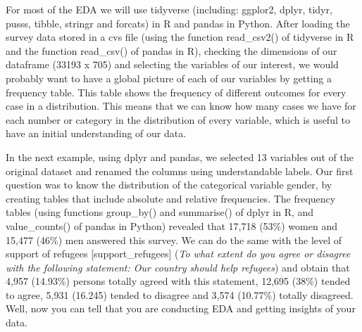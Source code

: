 For most of the EDA we will use tidyverse (including: ggplor2, dplyr, tidyr, pusss, tibble, stringr and forcats) in R and pandas in Python. After loading the survey data stored in a cvs file (using the function read\_csv2() of tidyverse in R and the function read\_csv() of pandas in R), checking the dimensions of our dataframe (33193 x 705) and selecting the variables of our interest, we would probably want to have a global picture of each of our variables by getting a frequency table. This table shows the frequency of different outcomes for every case in a distribution. This means that we can know how many cases we have for each number or category in the distribution of every variable, which is useful to have an initial understanding of our data.

		
In the next example, using dplyr and pandas, we selected 13 variables out of the original dataset and renamed the columns using understandable labels. Our first question was to know the distribution of the categorical variable gender, by creating tables that include absolute and relative frequencies. The frequency tables (using functions group\_by() and summarise() of dplyr in R, and value\_counts() of pandas in Python) revealed that 17,718 (53\%) women and 15,477 (46\%) men answered this survey. We can do the same with the level of support of refugees [support\_refugees] (\textit{To what extent do you agree or disagree with the following statement: Our country should help refugees}) and obtain that 4,957 (14.93\%) persons totally agreed with this statement, 12,695 (38\%) tended to agree, 5,931 (16.245) tended to disagree and 3,574 (10.77\%) totally disagreed. Well, now you can tell that you are conducting EDA and getting insights of your data.


